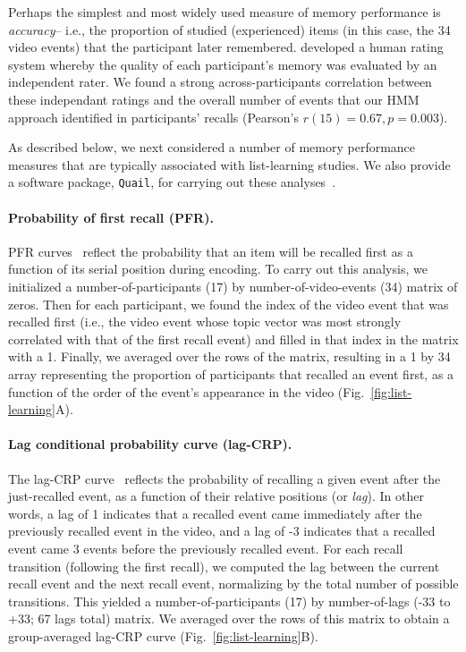 \documentclass{article}
\begin{document}
Perhaps the simplest and most widely used measure of memory performance is \textit{accuracy}-- i.e., the proportion of studied (experienced) items (in this case, the 34 video events) that the participant later remembered.  \cite{ChenEtal17} developed a human rating system whereby the quality of each participant's memory was evaluated by an independent rater.  We found a strong across-participants correlation between these independant ratings and the overall number of events that our HMM approach identified in participants' recalls (Pearson's $r(15) = 0.67, p = 0.003$).

As described below, we next considered a number of memory performance measures that are typically associated with list-learning studies.  We also provide a software package, \texttt{Quail}, for carrying out these analyses~\citep{HeusEtal17b}.

\paragraph{Probability of first recall (PFR).}  PFR curves~\citep{WelcBurn24, PostPhil65, AtkiShif68} reflect the probability that an item will be recalled first as a function of its serial position during encoding. To carry out this analysis, we initialized a number-of-participants (17) by number-of-video-events (34) matrix of zeros. Then for each participant, we found the index of the video event that was recalled first (i.e., the video event whose topic vector was most strongly correlated with that of the first recall event) and filled in that index in the matrix with a 1.  Finally, we averaged over the rows of the matrix, resulting in a 1 by 34 array representing the proportion of participants that recalled an event first, as a function of the order of the event's appearance in the video (Fig.~\ref{fig:list-learning}A).

\paragraph{Lag conditional probability curve (lag-CRP).} The lag-CRP curve~\citep{Kaha96} reflects the probability of recalling a given event after the just-recalled event, as a function of their relative positions (or \textit{lag}).  In other words, a lag of 1 indicates that a recalled event came immediately after the previously recalled event in the video, and a lag of -3 indicates that a recalled event came 3 events before the previously recalled event.  For each recall transition (following the first recall), we computed the lag between the current recall event and the next recall event, normalizing by the total number of possible transitions.  This yielded a number-of-participants (17) by number-of-lags (-33 to +33; 67 lags total) matrix. We averaged over the rows of this matrix to obtain a group-averaged lag-CRP curve (Fig.~\ref{fig:list-learning}B).
\end{document}
